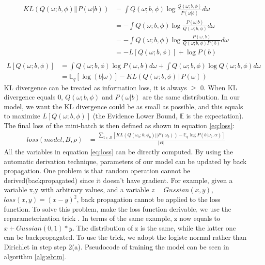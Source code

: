 \begin{equation}
    \begin{aligned}
        KL(Q(\omega;b,\phi)||P(\omega|b)) & = \int Q(\omega;b,\phi)\log\frac{Q(\omega;b,\phi)}{P(\omega|b)} d\omega\\
        & = - \int Q(\omega;b,\phi)\log\frac{P(\omega|b)}{Q(\omega;b,\phi)} d\omega\\
        & = - \int Q(\omega;b,\phi)\log\frac{P(\omega, b)}{Q(\omega;b,\phi)P(b)} d\omega\\
        & = - L[Q(\omega;b,\phi)] + \log P(b)\\
    \end{aligned} 
    \label{eq:KL}
\end{equation}
\begin{equation}
    \begin{aligned}
    L[Q(\omega;b,\phi)] & = \int Q(\omega;b,\phi)\log P(\omega, b) d\omega + \int Q(\omega;b,\phi) \log Q(\omega;b,\phi) d\omega\\
    & = \mathbb{E}_q[\log(b|\omega)] - KL(Q(\omega;b,\phi)||P(\omega))
    \end{aligned} 
    \label{eq:elbo}
\end{equation}
KL divergence can be treated as information loss, it is always $\geq$ 0. When KL divergence equals 0, $Q(\omega;b,\phi)$ and $P(\omega|b)$ are the same distribution. In our model, we want the KL divergence could be as small as possible, and this equals to maximize $L[Q(\omega;b,\phi)]$ (the Evidence Lower Bound, $\mathbb{E}$ is the expectation). The final loss of the mini-batch is then defined as shown in equation \ref{eq:loss}:
\begin{equation}
    \begin{aligned}
        loss(model, B, \rho) & = \frac{\sum_{b \in B}\left[KL(Q(\omega_b;b,\phi_b)||P(\omega_b))- \mathbb{E}_q\log P(b|\omega_b,\alpha)\right]}{|B|}  
    \end{aligned}    
    \label{eq:loss}
\end{equation}
All the variables in equation \ref{eq:loss} can be directly computed. By using the automatic derivation technique, parameters of our model can be updated by back propagation. One problem is that random operation cannot be derived(backpropagated) since it doesn't have gradient. For example, given a variable x,y with arbitrary values, and a variable $z = Gussian(x,y)$, $loss(x,y) = (x-y)^2$, back propagation cannot be applied to the loss function. To solve this problem, make the loss function derivable, we use the reparameterization trick \cite{kingma2013auto}. In terms of the same example, z now equals to $x + Gussian(0,1) * y$. The distribution of z is the same, while the latter one can be backpropagated. To use the trick, we adopt the logistc normal rather than Dirichlet in step step 2(a). Pseudocode of training the model can be seen in algorithm \ref{alg:ebtm}.
